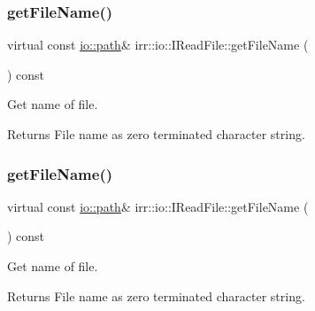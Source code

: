 \subsubsection{\texorpdfstring{get\+File\+Name()}{getFileName()}\hspace{0.1cm}{\footnotesize\ttfamily [1/2]}}
{\footnotesize\ttfamily virtual const \hyperlink{namespaceirr_1_1io_a6468281622ce3a1c46b72e19f32dded5}{io\+::path}\& irr\+::io\+::\+I\+Read\+File\+::get\+File\+Name (\begin{DoxyParamCaption}{ }\end{DoxyParamCaption}) const\hspace{0.3cm}{\ttfamily [pure virtual]}}



Get name of file. 

\begin{DoxyReturn}{Returns}
File name as zero terminated character string. 
\end{DoxyReturn}
\mbox{\label{classirr_1_1io_1_1IReadFile_a73b9c884319d2e4b0ff9a7ea15cbf316}} 
\subsubsection{\texorpdfstring{get\+File\+Name()}{getFileName()}\hspace{0.1cm}{\footnotesize\ttfamily [2/2]}}
{\footnotesize\ttfamily virtual const \hyperlink{namespaceirr_1_1io_a6468281622ce3a1c46b72e19f32dded5}{io\+::path}\& irr\+::io\+::\+I\+Read\+File\+::get\+File\+Name (\begin{DoxyParamCaption}{ }\end{DoxyParamCaption}) const\hspace{0.3cm}{\ttfamily [pure virtual]}}



Get name of file. 

\begin{DoxyReturn}{Returns}
File name as zero terminated character string. 
\end{DoxyReturn}
\mbox{\label{classirr_1_1io_1_1IReadFile_aeee143ee38871c30f240c025b100941d}} 
